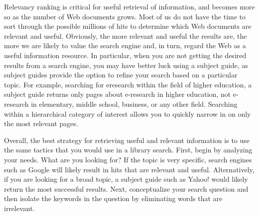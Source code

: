 \documentclass{article}
\begin{document}
Relevancy ranking is critical for useful retrieval of information, and becomes more so as the number of Web documents grows. Most of us do not have the time to sort through the possible millions of hits to determine which Web documents are relevant and useful. Obviously, the more relevant and useful the results are, the more we are likely to value the search engine and, in turn, regard the Web as a useful information resource. In particular, when you are not getting the desired results from a search engine, you may have better luck using a subject guide, as subject guides provide the option to refine your search based on a particular topic. For example, searching for eresearch within the field of higher education, a subject guide returns only pages about e-research in higher education, not e-research in elementary, middle school, business, or any other field. Searching within a hierarchical category of interest allows you to quickly narrow in on only the most relevant pages.

Overall, the best strategy for retrieving useful and relevant information is to use the same tactics that you would use in a library search. First, begin by analyzing your needs. What are you looking for? If the topic is very specific, search engines such as Google will likely result in hits that are relevant and useful. Alternatively, if you are looking for a broad topic, a subject guide such as Yahoo! would likely return the most successful results. Next, conceptualize your search question and then isolate the keywords in the question by eliminating words that are irrelevant.
\end{document}
